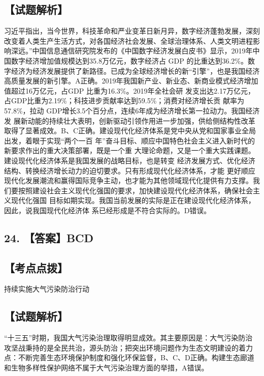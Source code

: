 \documentclass[UTF8,11pt]{ctexart}
\begin{document}
\subsection*{【试题解析】}

习近平指出，当今世界，科技革命和严业变革日新月异，数字经济蓬勃发展，深刻改变着人类生产生活方式，对各国经济社会发展、全球治理体系、人类文明进程影响深远。”中国信息通信研究院发布的《中国数字经济发展白皮书》显示，2019年中国数字经济增加值规模达到35.8万亿元，数字经济占 GDP 的比重达到36.2\%。数字经济为经济发展提供了新路径。已成为全球经济增长的新“引擎”，也是我国经济高质量发展的新引擎。A正确。2019年我国新产业、新业态、新商业模式经济增加值超过16万亿元，占GDP 比重为16.3\%。2019年全社会研 发支出达2.17万亿元，占GDP比重为2.19\%；科技进步贡献率达到59.5\%；消费对经济增长贡 献率为57.8\%，拉动 GDP增长3.5个百分点，连续6年成为经济增长第一拉动力。我国经济发 展新动能的持续壮大表明，创新驱动引领作用进一步加强，供给侧结构性改革取得了显著成效。B、C正确。建设现代化经济体系是党中央从党和国家事业全局出发，着眼于实现“两个一百 年”奋斗目标、顺应中国特色社会主义进入新时代的新要求作出的重大决策部署，既是一个重 大理论命题，又是一个重大实践课题。建设现代化经济体系是我国发展的战略目标，也是转变 经济发展方式、优化经济结构、转换经济增长动力的迫切要求。只有形成现代化经济体系，才能 更好顺应现代化发展潮流和赢得国际竞争主动，也才能为其他领域现代化提供有力支撑。我们要按照建设社会主义现代化强国的要求，加快建设现代化经济体系，确保社会主义现代化强国 目标如期实现。我国当前发展的实际是正在建设现代化经济体系，因此，说我国现代化经济体 系已经形成是不符合实际的。D错误。


\subsection*{24. 【答案】BCD}

\subsection*{【考点点拨】}

持续实施大气污染防治行动


\subsection*{【试题解析】}

“十三五”时期，我国大气污染治理取得明显成效。其主要原因是：大气污染防治 攻坚战秉持的是全民共治，源头防治；把突出环境问题作为生态文明建设的着力点：不断完善生态环境保护制度和强化环保监督，B、C、D正确。构建生态廊道和生物多样性保护网络不属于大气污染治理方面的举措，A错误。
\end{document}
